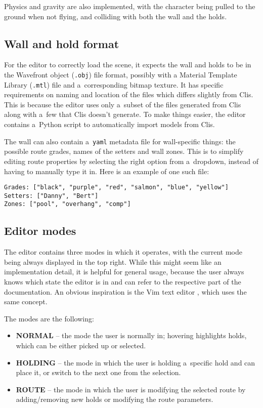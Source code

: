 Physics and gravity are also implemented, with the character being pulled to the ground when not flying, and colliding with both the wall and the holds.

\subsection{Wall and hold format}
For the editor to correctly load the scene, it expects the wall and holds to be in the Wavefront object (\verb|.obj|) file format, possibly with a Material Template Library (\verb|.mtl|) file and a~corresponding bitmap texture.
It has specific requirements on naming and location of the files which differs slightly from Clis.
This is because the editor uses only a~subset of the files generated from Clis along with a~few that Clis doesn't generate.
To make things easier, the editor contains a~Python script to automatically import models from Clis.

The wall can also contain a~\verb|yaml| metadata file for wall-specific things: the possible route grades, names of the setters and wall zones.
This is to simplify editing route properties by selecting the right option from a~dropdown, instead of having to manually type it in.
Here is an example of one such file:

\begin{verbatim}
Grades: ["black", "purple", "red", "salmon", "blue", "yellow"]
Setters: ["Danny", "Bert"]
Zones: ["pool", "overhang", "comp"]
\end{verbatim}

\subsection{Editor modes}
The editor contains three modes in which it operates, with the current mode being always displayed in the top right.
While this might seem like an implementation detail, it is helpful for general usage, because the user always knows which state the editor is in and can refer to the respective part of the documentation.
An obvious inspiration is the Vim text editor \cite{vim}, which uses the same concept.

The modes are the following:

\begin{itemize}
	\item \textbf{NORMAL} -- the mode the user is normally in; hovering highlights holds, which can be either picked up or selected.
	\item \textbf{HOLDING} -- the mode in which the user is holding a~specific hold and can place it, or switch to the next one from the selection.
	\item \textbf{ROUTE} -- the mode in which the user is modifying the selected route by adding/removing new holds or modifying the route parameters.
\end{itemize}

